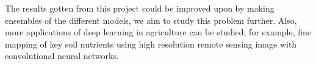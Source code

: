 \documentclass[12pt]{report}
\numberwithin{equation}{section}
\begin{document}
The results gotten from this project could be improved upon by making ensembles of the different models, we aim to study this problem further. Also, more applications of deep learning in agriculture can be studied, for example, fine mapping of key soil nutrients using high resolution remote sensing image with convolutional neural networks.
	



\newpage
{}
\renewcommand{\bibname}{\centering References}
 
 
 
 
 

%  
%  






\nocite{MatrixCalculus}
\nocite{guarav}
\nocite{pmlr-v15-glorot11a}
\nocite{10.5555/1162264}
\nocite{zhang2020dive}
\nocite{behera2019performance}
\end{document}
